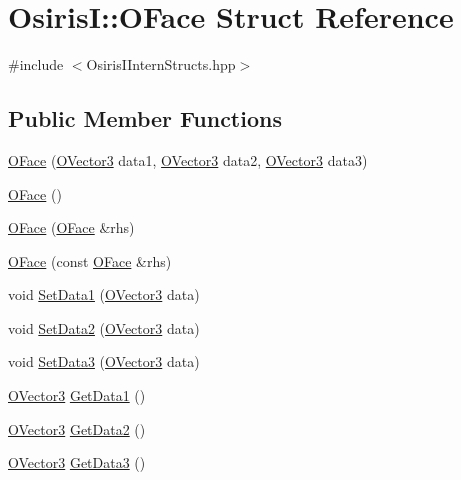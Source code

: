 \hypertarget{struct_osiris_i_1_1_o_face}{\section{Osiris\-I\-:\-:O\-Face Struct Reference}
\label{struct_osiris_i_1_1_o_face}
}


{\ttfamily \#include $<$Osiris\-I\-Intern\-Structs.\-hpp$>$}

\subsection*{Public Member Functions}
\begin{DoxyCompactItemize}
\item 
\hyperlink{struct_osiris_i_1_1_o_face_abafcf0ff91ecae629ffd709aa857dc63}{O\-Face} (\hyperlink{struct_osiris_i_1_1_o_vector3}{O\-Vector3} data1, \hyperlink{struct_osiris_i_1_1_o_vector3}{O\-Vector3} data2, \hyperlink{struct_osiris_i_1_1_o_vector3}{O\-Vector3} data3)
\item 
\hyperlink{struct_osiris_i_1_1_o_face_ad3a80a94ea12f358ac7b6367afe9b3ec}{O\-Face} ()
\item 
\hyperlink{struct_osiris_i_1_1_o_face_a1ff74229e5df63fbfdf13fda1b69f09e}{O\-Face} (\hyperlink{struct_osiris_i_1_1_o_face}{O\-Face} \&rhs)
\item 
\hyperlink{struct_osiris_i_1_1_o_face_ae52d8a2ad20362081752891683ee1c2b}{O\-Face} (const \hyperlink{struct_osiris_i_1_1_o_face}{O\-Face} \&rhs)
\item 
void \hyperlink{struct_osiris_i_1_1_o_face_ae365fec22b6f028e60574b37bc432d8f}{Set\-Data1} (\hyperlink{struct_osiris_i_1_1_o_vector3}{O\-Vector3} data)
\item 
void \hyperlink{struct_osiris_i_1_1_o_face_a4b214893bf00723e6cea95d347769d7a}{Set\-Data2} (\hyperlink{struct_osiris_i_1_1_o_vector3}{O\-Vector3} data)
\item 
void \hyperlink{struct_osiris_i_1_1_o_face_ab1ed928c7f76727d2ecd85418191da1f}{Set\-Data3} (\hyperlink{struct_osiris_i_1_1_o_vector3}{O\-Vector3} data)
\item 
\hyperlink{struct_osiris_i_1_1_o_vector3}{O\-Vector3} \hyperlink{struct_osiris_i_1_1_o_face_a28601b5c9ce65bf87451d0e5ec38c89d}{Get\-Data1} ()
\item 
\hyperlink{struct_osiris_i_1_1_o_vector3}{O\-Vector3} \hyperlink{struct_osiris_i_1_1_o_face_a2d5efd06339a0c2e43b82b88b00730e8}{Get\-Data2} ()
\item 
\hyperlink{struct_osiris_i_1_1_o_vector3}{O\-Vector3} \hyperlink{struct_osiris_i_1_1_o_face_a65b4a034f71bfa965e069159c15b585f}{Get\-Data3} ()
\end{DoxyCompactItemize}


